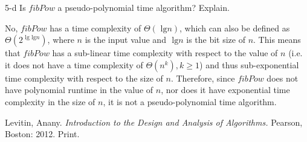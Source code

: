 \documentclass[11pt]{article}
\newcommand{\tlg}{\text{ lg}}
\begin{document}
\begin{prob}{5-d}
Is $fibPow$ a pseudo-polynomial time algorithm? Explain.
\end{prob}
\begin{sol}

No, $fibPow$ has a time complexity of $\Theta(\tlg n)$, which can also be defined as $\Theta(2^{\tlg \tlg n})$, where $n$ is the input value and $\tlg n$ is the bit size of $n$. This means that $fibPow$ has a sub-linear time complexity with respect to the value of $n$ (i.e. it does not have a time complexity of $\Theta(n^{k}), k \geq 1$) and thus sub-exponential time complexity with respect to the size of $n$. Therefore, since $fibPow$ does not have polynomial runtime in the value of $n$, nor does it have exponential time complexity in the size of $n$, it is not a pseudo-polynomial time algorithm.


\end{sol}

\begin{thebibliography}{}
Levitin, Anany. {\it Introduction to the Design and Analysis of Algorithms.} Pearson, Boston: 2012. Print.
\end{thebibliography}
\end{document}

